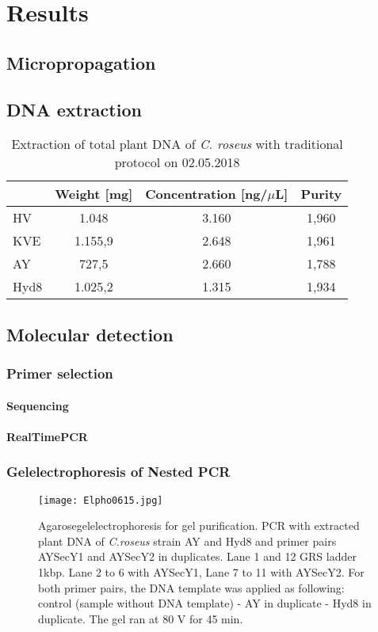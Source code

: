 \documentclass[a4paper]{article}
\begin{document}
\section{Results}

\subsection{Micropropagation}

\subsection{DNA extraction}
\begin{table}[!h]
\centering
\caption{Extraction of total plant DNA of \textit{C. roseus} with traditional protocol on 02.05.2018}
{ 
\begin{tabular} { | l | c | c | c|}\hline
	&	Weight  [mg]	&	Concentration [ng/$\mu$L] & Purity 	\\ \hline 
HV	&	1.048		&	3.160					&	1,960	\\ \hline
KVE 	&	1.155,9		&	2.648				& 	1,961	\\ \hline
AY	&	727,5		&	2.660					&	1,788	\\ \hline
Hyd8 &	1.025,2		&	1.315				&	1,934	\\ \hline
\end{tabular}}
\end{table}

\subsection{Molecular detection}
\subsubsection{Primer selection}
\paragraph{Sequencing}
\paragraph{RealTimePCR}
\subsubsection{Gelelectrophoresis of Nested PCR}
\begin{figure}[H]
	\centering
	\texttt{[image: Elpho0615.jpg]}
	\caption[Agarosegelelectrophoresis for gel purification. ]{Agarosegelelectrophoresis for gel purification. PCR with extracted plant DNA of \textit{C.roseus} strain AY and Hyd8 and primer pairs AYSecY1 and AYSecY2 in duplicates. Lane 1 and 12 GRS ladder 1kbp. Lane 2 to 6 with AYSecY1, Lane 7 to 11 with AYSecY2. For both primer pairs, the DNA template was applied as following: control (sample without DNA template) - AY in duplicate - Hyd8 in duplicate. The gel ran at 80 V for 45 min.}
	\label{fig:elpho0615}
\end{figure}
\end{document}
